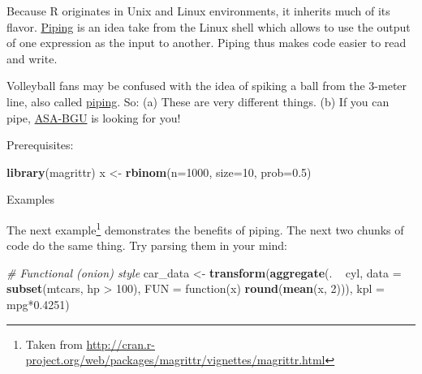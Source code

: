 \documentclass[]{book}
\newenvironment{Shaded}{\begin{snugshade}}{\end{snugshade}}
\newcommand{\KeywordTok}[1]{\textcolor[rgb]{0.13,0.29,0.53}{\textbf{{#1}}}}
\newcommand{\DataTypeTok}[1]{\textcolor[rgb]{0.13,0.29,0.53}{{#1}}}
\newcommand{\DecValTok}[1]{\textcolor[rgb]{0.00,0.00,0.81}{{#1}}}
\newcommand{\FloatTok}[1]{\textcolor[rgb]{0.00,0.00,0.81}{{#1}}}
\newcommand{\StringTok}[1]{\textcolor[rgb]{0.31,0.60,0.02}{{#1}}}
\newcommand{\CommentTok}[1]{\textcolor[rgb]{0.56,0.35,0.01}{\textit{{#1}}}}
\newcommand{\NormalTok}[1]{{#1}}
\theoremstyle{definition}
\theoremstyle{definition}
\theoremstyle{remark}
\let\BeginKnitrBlock\begin \let\EndKnitrBlock\end
\begin{document}
Because R originates in Unix and Linux environments, it inherits much of
its flavor.
\href{http://ryanstutorials.net/linuxtutorial/piping.php}{Piping} is an
idea take from the Linux shell which allows to use the output of one
expression as the input to another. Piping thus makes code easier to
read and write.

\BeginKnitrBlock{remark}
Volleyball fans may be confused with the idea of
spiking a ball from the 3-meter line, also called
\href{https://www.youtube.com/watch?v=GWW15Nr1lQM}{piping}. So: (a)
These are very different things. (b) If you can pipe,
\href{http://in.bgu.ac.il/sport/Pages/asa.aspx}{ASA-BGU} is looking for
you!
\EndKnitrBlock{remark}

Prerequisites:

\begin{Shaded}
\begin{Highlighting}[]
\KeywordTok{library}\NormalTok{(magrittr)}
\NormalTok{x <-}\StringTok{ }\KeywordTok{rbinom}\NormalTok{(}\DataTypeTok{n=}\DecValTok{1000}\NormalTok{, }\DataTypeTok{size=}\DecValTok{10}\NormalTok{, }\DataTypeTok{prob=}\FloatTok{0.5}\NormalTok{)}
\end{Highlighting}
\end{Shaded}

Examples

\begin{Shaded}
\end{Shaded}

The next example\footnote{Taken from
  \url{http://cran.r-project.org/web/packages/magrittr/vignettes/magrittr.html}}
demonstrates the benefits of piping. The next two chunks of code do the
same thing. Try parsing them in your mind:

\begin{Shaded}
\begin{Highlighting}[]
\CommentTok{# Functional (onion) style}
\NormalTok{car_data <-}\StringTok{ }
\StringTok{  }\KeywordTok{transform}\NormalTok{(}\KeywordTok{aggregate}\NormalTok{(. ~}\StringTok{ }\NormalTok{cyl, }
                      \DataTypeTok{data =} \KeywordTok{subset}\NormalTok{(mtcars, hp >}\StringTok{ }\DecValTok{100}\NormalTok{), }
                      \DataTypeTok{FUN =} \NormalTok{function(x) }\KeywordTok{round}\NormalTok{(}\KeywordTok{mean}\NormalTok{(x, }\DecValTok{2}\NormalTok{))), }
            \DataTypeTok{kpl =} \NormalTok{mpg*}\FloatTok{0.4251}\NormalTok{)}
\end{Highlighting}
\end{Shaded}
\end{document}
